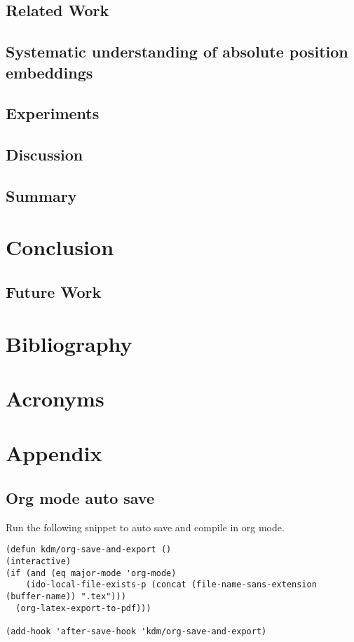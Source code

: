 \documentclass[letterpaper, 11pt]{article}
\begin{document}
\subsection{Related Work}
\label{sec:org16b0258}
\subsection{Systematic understanding of absolute position embeddings}
\label{sec:org320f105}
\subsection{Experiments}
\label{sec:orgcf49f75}
\subsection{Discussion}
\label{sec:org180c1ae}
\subsection{Summary}
\label{sec:orgd3e8a8b}
\clearpage
\section{Conclusion}
\label{sec:orgd1e81e1}
\subsection{Future Work}
\label{sec:org6e5d10c}
\clearpage
\section{Bibliography}
\label{sec:org90a42a7}



\section{Acronyms}
\label{sec:org602881a}

\section{Appendix}
\label{sec:org80e0213}
\subsection{Org mode auto save}
\label{sec:orgc1d3985}
Run the following snippet to auto save and compile in org mode.

\begin{verbatim}
(defun kdm/org-save-and-export ()
(interactive)
(if (and (eq major-mode 'org-mode)
    (ido-local-file-exists-p (concat (file-name-sans-extension (buffer-name)) ".tex")))
  (org-latex-export-to-pdf)))

(add-hook 'after-save-hook 'kdm/org-save-and-export)
\end{verbatim}
\end{document}
